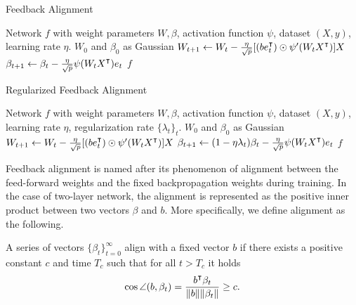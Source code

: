 \begin{minipage}{0.49\textwidth}
\begin{algorithm}[H]
\centering
\caption{Feedback Alignment}\label{algo:fa}
    \begin{algorithmic}[1]
        \Require Network $f$ with weight parameters $W,\beta$, activation function $\psi$, dataset $(X,y)$, learning rate $\eta$.
         $W_0$ and $\beta_0$ as Gaussian
            \State $W_{t+1} \gets W_t - \frac{\eta}{\sqrt p}[(b e_t\transpose)\odot \psi'(W_tX\transpose)] X$
            \State $\beta_{t+1} \gets \beta_t - \frac{\eta}{\sqrt p} \psi(W_tX\transpose) e_t$
        \EndWhile
        \State \Return $f$
    \end{algorithmic}    
\end{algorithm}
\end{minipage}
\hfill
\begin{minipage}{0.49\textwidth}
\begin{algorithm}[H]
\centering
\caption{Regularized Feedback Alignment}\label{algo:fa-reg}
    \begin{algorithmic}[1]
        \Require Network $f$ with weight parameters $W,\beta$, activation function $\psi$, dataset $(X,y)$, learning rate $\eta$, regularization rate $\{\lambda_t\}_t$.
         $W_0$ and $\beta_0$ as Gaussian
            \State $W_{t+1} \gets W_t - \frac{\eta}{\sqrt p}[(b e_t\transpose)\odot \psi'(W_tX\transpose)] X$
            \State $\beta_{t+1} \gets (1-\eta\lambda_t)\beta_t - \frac{\eta}{\sqrt p} \psi(W_tX\transpose) e_t$
        \EndWhile
        \State \Return $f$
    \end{algorithmic}    
\end{algorithm}
\end{minipage}

Feedback alignment is named after its phenomenon of alignment between the feed-forward weights and the fixed backpropagation weights during training. In the case of two-layer network, the alignment is represented as the positive inner product between two vectors $\beta$ and $b$. More specifically, we define alignment as the following.
\begin{definition}\label{def:alignment}
    A series of vectors $\{\beta_t\}_{t=0}^\infty$ align with a fixed vector $b$ if there exists a positive constant $c$ and time $T_c$ such that for all $t > T_c$ it holds
    \begin{align*}
        \cos\angle(b, \beta_t) = \frac{b\transpose \beta_t}{\|b\|\|\beta_t\|} \geq c.
    \end{align*}
\end{definition}